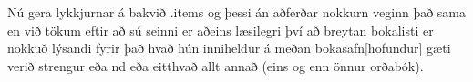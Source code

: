 Nú gera lykkjurnar á bakvið .items og þessi án aðferðar nokkurn veginn það sama en við tökum eftir að sú seinni er aðeins læsilegri því að breytan bokalisti er nokkuð lýsandi fyrir það hvað hún inniheldur á meðan bokasafn[hofundur] gæti verið strengur eða nd eða eitthvað allt annað (eins og enn önnur orðabók).